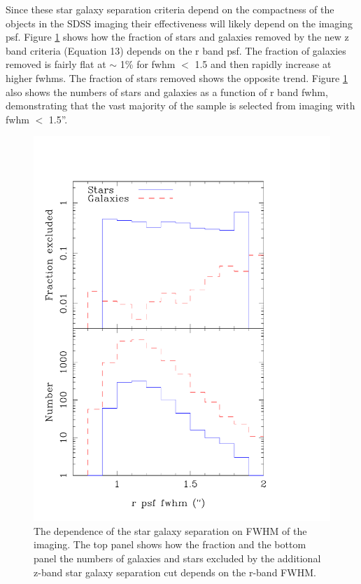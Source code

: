 \documentclass[preprint]{aastex}
\begin{document}
Since these star galaxy separation criteria depend on the compactness of the
objects in the SDSS imaging their effectiveness will likely depend on the
imaging psf. Figure \ref{fig:stargal_psf} shows how the fraction of stars and
galaxies removed by the new z band criteria (Equation 13) depends on the r band
psf. The fraction of galaxies removed is fairly flat at $\sim$ 1\% for fwhm $<$
1.5 and then rapidly increase at higher fwhms. The fraction of stars removed
shows the opposite trend. Figure \ref{fig:stargal_psf} also shows the numbers of
stars and galaxies as a function of r band fwhm, demonstrating that the vast
majority of the sample is selected from imaging with fwhm $<$ 1.5''.

\begin{figure}
\includegraphics[width=0.95\columnwidth]{plots/star_gal_chunk2_psf_paper}
\caption{The dependence of the star galaxy separation on FWHM of the imaging. 
The top panel shows how the fraction and the bottom panel the numbers of
galaxies and stars excluded by the additional z-band star galaxy separation cut
depends on the r-band FWHM. }
\label{fig:stargal_psf}
\end{figure}
\end{document}
